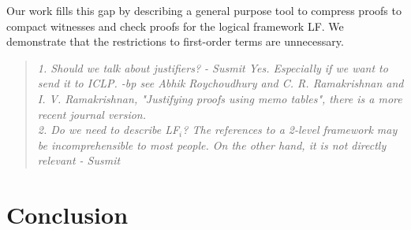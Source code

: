 \documentclass{acmconf}
\newenvironment{note}{\begin{quote}\message{note!}\it}{\end{quote}}
\begin{document}
 Our work fills this gap by describing a general purpose tool to
 compress proofs to compact witnesses and check proofs for the logical
framework LF. We demonstrate that the restrictions to first-order terms
are unnecessary. 

\begin{note}
 1. Should we talk about justifiers? - Susmit Yes. Especially if we
 want to send it to ICLP. -bp see Abhik Roychoudhury and C. R. Ramakrishnan and I. V. Ramakrishnan,
    "Justifying proofs using memo tables", there is a more recent
    journal version.\\
 2. Do we need to describe LF$_i$? The references to a 2-level framework 
    may be incomprehensible to most people. On the other hand, it is not
    directly relevant - Susmit
\end{note}

\section{Conclusion}




\end{document}
